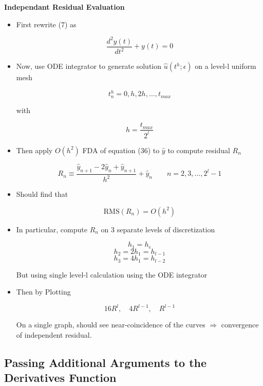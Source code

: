 \textbf{Independant Residual Evaluation}

\begin{itemize}
    \item First rewrite (7) as 

    \begin{equation}
        \frac{d^2y(t)}{dt^2} + y(t) = 0
    \end{equation}

    \item Now, use ODE integrator to generate solution $\hat{u}(t^h;\epsilon)$ on a level-l uniform mesh

    \[ t^h_n = 0,h,2h,\ldots, t_{max}\]

    with 

    \[h=\frac{t_{max}}{2^l}\]

    \item Then apply $O(h^2)$ FDA of equation (36) to $\hat{y}$ to compute residual $R_n$

    \[ R_n \equiv \frac{\hat{y}_{n+1}-2\hat{y}_n+\hat{y}_{n+1}}{h^2} + \hat{y}_n \qquad n=2,3,\ldots , 2^l-1\]

    \item Should find that

    \[ \text{RMS}(R_n) = O(h^2)\]

    \item In particular, compute $R_n$ on 3 separate levels of discretization

    \[ h_1 = h_e\]
    \[ h_2 = 2h_1 = h_{l-1}\]
    \[ h_3 = 4h_1 = h_{l-2}\]

    But using single level-l calculation using the ODE integrator

    \item Then by Plotting 

    \[ 16R^l, \quad 4R^{l-1}, \quad R^{l-1}\]

    On a single graph, should see near-coincidence of the curves $\Rightarrow$ convergence of independent residual.
    
\end{itemize}

\subsection{Passing Additional Arguments to the Derivatives Function}


